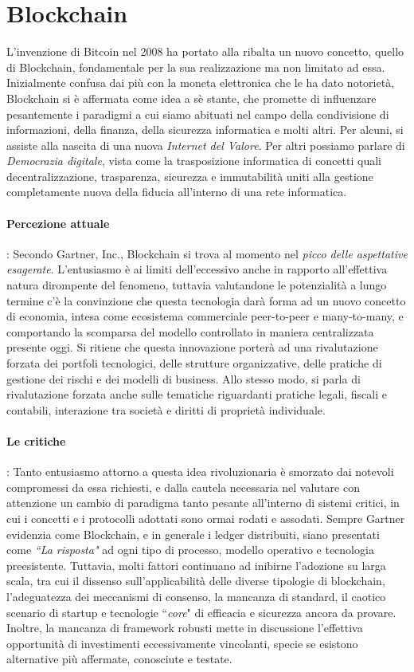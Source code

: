 \section{Blockchain}
	L'invenzione di Bitcoin nel 2008 ha portato alla ribalta un nuovo concetto, quello di Blockchain, fondamentale per la sua realizzazione ma non limitato ad essa. Inizialmente confusa dai più con la moneta elettronica che le ha dato notorietà,  Blockchain si è affermata come idea a sè stante, che promette di influenzare pesantemente i paradigmi a cui siamo abituati nel campo della condivisione di informazioni, della finanza, della sicurezza informatica e molti altri. Per alcuni, si assiste alla nascita di una nuova \emph{Internet del Valore}. Per altri possiamo parlare di \emph{Democrazia digitale}, vista come la trasposizione informatica di concetti quali decentralizzazione, trasparenza, sicurezza e immutabilità uniti alla gestione completamente nuova della fiducia all'interno di una rete informatica.
	\paragraph{Percezione attuale}: Secondo Gartner, Inc.\cite{gartner}, Blockchain si trova al momento nel \emph{picco delle aspettative esagerate}. L'entusiasmo è ai limiti dell'eccessivo anche in rapporto all'effettiva natura dirompente del fenomeno, tuttavia valutandone le potenzialità a lungo termine c'è la convinzione che questa tecnologia darà forma ad un nuovo concetto di economia, intesa come ecosistema commerciale peer-to-peer e many-to-many, e comportando la scomparsa del modello controllato in maniera centralizzata presente oggi. Si ritiene che questa innovazione porterà ad una rivalutazione forzata dei portfoli tecnologici, delle strutture organizzative, delle pratiche di gestione dei rischi e dei modelli di business. Allo stesso modo, si parla di rivalutazione forzata anche sulle tematiche riguardanti pratiche legali, fiscali e contabili, interazione tra società e diritti di proprietà individuale.
	\paragraph{Le critiche}: Tanto entusiasmo attorno a questa idea rivoluzionaria è smorzato dai notevoli compromessi da essa richiesti, e dalla cautela necessaria nel valutare con attenzione un cambio di paradigma tanto pesante all'interno di sistemi critici, in cui i concetti e i protocolli adottati sono ormai rodati e assodati. Sempre Gartner evidenzia come Blockchain, e in generale i ledger distribuiti, siano presentati come \emph{``La risposta"} ad ogni tipo di processo, modello operativo e tecnologia preesistente. Tuttavia, molti fattori continuano ad inibirne l'adozione su larga scala, tra cui il dissenso sull'applicabilità delle diverse tipologie di blockchain, l'adeguatezza dei meccanismi di consenso, la mancanza di standard, il caotico scenario di startup e tecnologie ``\emph{core}" di efficacia e sicurezza ancora da provare. Inoltre, la mancanza di framework robusti mette in discussione l'effettiva opportunità di investimenti eccessivamente vincolanti, specie se esistono alternative più affermate, conosciute e testate.

